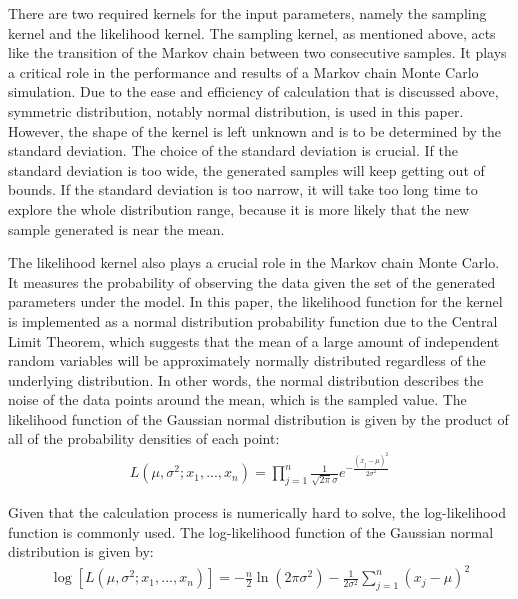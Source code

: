 There are two required kernels for the input parameters, namely the sampling kernel and the likelihood kernel. The sampling kernel, as mentioned above, acts like the transition of the Markov chain between two consecutive samples. It plays a critical role in the performance and results of a Markov chain Monte Carlo simulation.\cite{mcmc_practice} Due to the ease and efficiency of calculation that is discussed above, symmetric distribution, notably normal distribution, is used in this paper.\cite{gaussian_distribution_property} However, the shape of the kernel is left unknown and is to be determined by the standard deviation.\cite{normal} The choice of the standard deviation is crucial. If the standard deviation is too wide, the generated samples will keep getting out of bounds. If the standard deviation is too narrow, it will take too long time to explore the whole distribution range, because it is more likely that the new sample generated is near the mean. 

The likelihood kernel also plays a crucial role in the Markov chain Monte Carlo. It measures the probability of observing the data given the set of the generated parameters under the model.\cite{likelihood_general} In this paper, the likelihood function for the kernel is implemented as a normal distribution probability function due to the Central Limit Theorem, which suggests that the mean of a large amount of independent random variables will be approximately normally distributed regardless of the underlying distribution.\cite{central_limit_theorem} In other words, the normal distribution describes the noise of the data points around the mean, which is the sampled value. The likelihood function of the Gaussian normal distribution is given by the product of all of the probability densities of each point:\cite{gaussian_likelihood}
\begin{align}
    L(\mu, \sigma^2; x_1, ..., x_n) = \prod_{j=1}^n \frac{1}{\sqrt{2\pi}\sigma} e^{-\frac{(x_j-\mu)^2}{2\sigma^2}}
\end{align}

Given that the calculation process is numerically hard to solve, the log-likelihood function is commonly used.\cite{log_likelihood} The log-likelihood function of the Gaussian normal distribution is given by:\cite{log_gaussian_likelihood}
\begin{align}
    \log[L(\mu, \sigma^2; x_1, ..., x_n)] = -\frac n 2\ln(2\pi\sigma^2) - \frac 1 {2\sigma^2}\sum_{j=1}^n (x_j - \mu)^2
\end{align}
 
